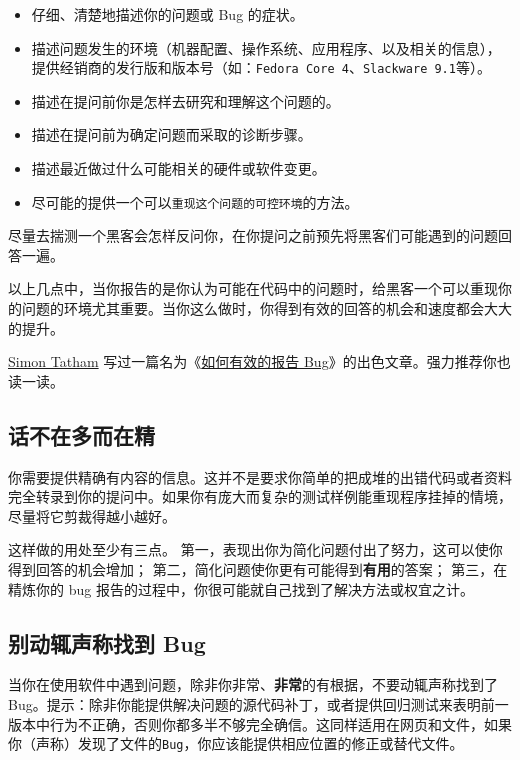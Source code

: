 \documentclass[titlepage]{article}
\begin{document}
\begin{itemize}

\item
  仔细、清楚地描述你的问题或 Bug 的症状。
\item
  描述问题发生的环境（机器配置、操作系统、应用程序、以及相关的信息），提供经销商的发行版和版本号（如：\texttt{Fedora\ Core\ 4}、\texttt{Slackware\ 9.1}等）。
\item
  描述在提问前你是怎样去研究和理解这个问题的。
\item
  描述在提问前为确定问题而采取的诊断步骤。
\item
  描述最近做过什么可能相关的硬件或软件变更。
\item
  尽可能的提供一个可以\texttt{重现这个问题的可控环境}的方法。
\end{itemize}

尽量去揣测一个黑客会怎样反问你，在你提问之前预先将黑客们可能遇到的问题回答一遍。

以上几点中，当你报告的是你认为可能在代码中的问题时，给黑客一个可以重现你的问题的环境尤其重要。当你这么做时，你得到有效的回答的机会和速度都会大大的提升。

\href{http://www.chiark.greenend.org.uk/~sgtatham/}{Simon Tatham}
写过一篇名为《\href{http://www.chiark.greenend.org.uk/~sgtatham/bugs-tw.html}{如何有效的报告
Bug}》的出色文章。强力推荐你也读一读。

\hypertarget{ux8bddux4e0dux5728ux591aux800cux5728ux7cbe}{\subsection{话不在多而在精}\label{ux8bddux4e0dux5728ux591aux800cux5728ux7cbe}}

你需要提供精确有内容的信息。这并不是要求你简单的把成堆的出错代码或者资料完全转录到你的提问中。如果你有庞大而复杂的测试样例能重现程序挂掉的情境，尽量将它剪裁得越小越好。

这样做的用处至少有三点。
第一，表现出你为简化问题付出了努力，这可以使你得到回答的机会增加；
第二，简化问题使你更有可能得到\textbf{有用}的答案； 第三，在精炼你的 bug
报告的过程中，你很可能就自己找到了解决方法或权宜之计。

\hypertarget{ux522bux52a8ux8f84ux58f0ux79f0ux627eux5230-bug}{\subsection{别动辄声称找到
Bug}\label{ux522bux52a8ux8f84ux58f0ux79f0ux627eux5230-bug}}

当你在使用软件中遇到问题，除非你非常、\textbf{非常}的有根据，不要动辄声称找到了
Bug。提示：除非你能提供解决问题的源代码补丁，或者提供回归测试来表明前一版本中行为不正确，否则你都多半不够完全确信。这同样适用在网页和文件，如果你（声称）发现了文件的\texttt{Bug}，你应该能提供相应位置的修正或替代文件。
\end{document}
